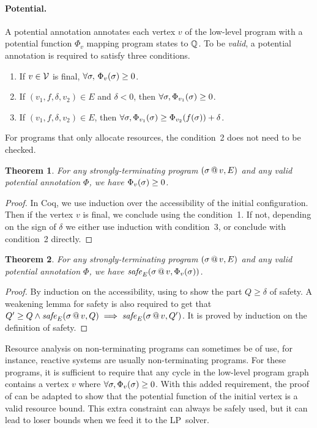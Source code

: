 \documentclass[nocopyrightspace,preprint]{sigplanconf-pldi15}
\newcommand{\pref}[1]{\prettyref{#1}}
\newtheorem{theorem}{Theorem}
\begin{document}
\paragraph{Potential.} A potential annotation annotates
each vertex $v$ of the low-level program with a potential
function $\Phi_v$ mapping program states to $\mathbb{Q}$.
To be \emph{valid}, a potential annotation is required
to satisfy three conditions.
%
\begin{enumerate}
\item If $v \in \mathcal V$ is final,
  $\forall \sigma,\, \Phi_v(\sigma) \ge 0$.
\item If $(v_1, f, \delta, v_2) \in E$ and $\delta < 0$,
  then $\forall \sigma, \Phi_{v_1}(\sigma) \ge 0$.
\item If $(v_1, f, \delta, v_2) \in E$,
  then $\forall \sigma, \Phi_{v_1}(\sigma) \ge \Phi_{v_2}(f(\sigma)) + \delta$.
\end{enumerate}
%
For programs that only allocate resources, the condition~2 does not
need to be checked.

\begin{theorem}
  \label{thm:pos}
  For any strongly-terminating program $(\sigma\,@\,v, E)$ and
  any valid potential annotation $\Phi$, we have
  $\Phi_v(\sigma) \ge 0$.
\end{theorem}
\begin{proof}
In Coq, we use induction over the accessibility of the initial
configuration.  Then if the vertex $v$ is final, we conclude
using the condition~1.  If not, depending on the sign of $\delta$
we either use induction with condition~3, or conclude with condition~2
directly.
\end{proof}

\begin{theorem}
  \label{thm:snd}
  For any strongly-terminating program $(\sigma\,@\,v, E)$
  and any valid potential annotation $\Phi$, we have
  $\mathit{safe}_E(\sigma\,@\,v, \Phi_v(\sigma))$.
\end{theorem}
\begin{proof}
By induction on the accessibility, using \pref{thm:pos}
to show the part $Q \ge \delta$ of safety.  A weakening
lemma for safety is also required to get that
$Q' \ge Q \land \mathit{safe}_E(\sigma\,@\,v, Q) \implies \mathit{safe}_E(\sigma\,@\,v, Q')$.
It is proved by induction on the definition of
safety.
\end{proof}

Resource analysis on non-terminating programs can sometimes
be of use, for instance, reactive systems are usually non-terminating
programs.
For these programs, it is sufficient to require that any cycle
in the low-level program graph contains a vertex $v$ where
$\forall \sigma, \Phi_v(\sigma) \ge 0$.
With this added requirement, the proof of \pref{thm:snd} can be
adapted to show that the potential function of the initial
vertex is a valid resource bound.  This extra constraint can
always be safely used, but it can lead to loser bounds when
we feed it to the LP~solver.
\end{document}
